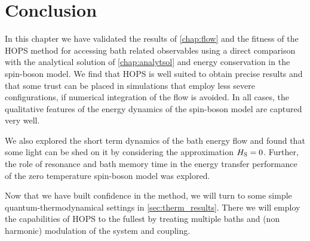 \section{Conclusion}%
\label{sec:conclusion-1}

In this chapter we have validated the results of \cref{chap:flow} and
the fitness of the HOPS method for accessing bath related observables
using a direct comparison with the analytical solution of
\cref{chap:analytsol} and energy conservation in the spin-boson
model. We find that HOPS is well suited to obtain precise results
and that some trust can be placed in simulations that employ less
severe configurations, if numerical integration of the flow is
avoided. In all cases, the qualitative features of the energy
dynamics of the spin-boson model are captured very well.

We also explored the short term dynamics of the bath energy flow and
found that some light can be shed on it by considering the
approximation \(H_{\mathrm{S}} = 0\). Further, the role of resonance and
bath memory time in the energy transfer performance of the zero
temperature spin-boson model was explored.

Now that we have built confidence in the method, we will turn to some
simple quantum-thermodynamical settings in
\cref{sec:therm_results}. There we will employ the capabilities of
HOPS to the fullest by treating multiple baths and (non harmonic)
modulation of the system and coupling.
